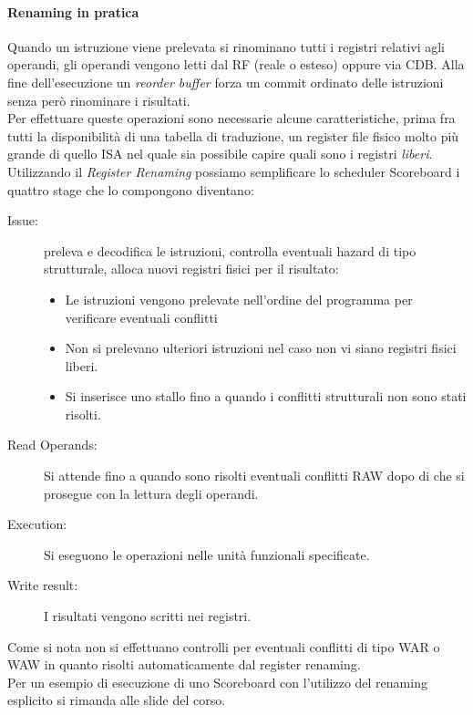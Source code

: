 \paragraph{Renaming in pratica}
Quando un istruzione viene prelevata si rinominano tutti i registri relativi agli operandi, gli operandi vengono letti dal RF (reale o esteso) oppure via CDB. Alla fine dell'esecuzione un \emph{reorder buffer} forza un commit ordinato delle istruzioni senza però rinominare i risultati.\\
Per effettuare queste operazioni sono necessarie alcune caratteristiche, prima fra tutti la disponibilità di una tabella di traduzione, un register file fisico molto più grande di quello ISA nel quale sia possibile capire quali sono i registri \emph{liberi}.\\
Utilizzando il \emph{Register Renaming} possiamo semplificare lo scheduler Scoreboard i quattro stage che lo compongono diventano:
\begin{description}
\item[Issue:] preleva e decodifica le istruzioni, controlla eventuali hazard di tipo strutturale, alloca nuovi registri fisici per il risultato:
\begin{itemize}
\item Le istruzioni vengono prelevate nell'ordine del programma per verificare eventuali conflitti 
\item Non si prelevano ulteriori istruzioni nel caso non vi siano registri fisici liberi.
\item Si inserisce uno stallo fino a quando i conflitti strutturali non sono stati risolti.
\end{itemize}
\item[Read Operands:] Si attende fino a quando sono risolti eventuali conflitti RAW dopo di che si prosegue con la lettura degli operandi.
\item[Execution:] Si eseguono le operazioni nelle unità funzionali specificate.
\item[Write result:] I risultati vengono scritti nei registri.
\end{description}
Come si nota non si effettuano controlli per eventuali conflitti di tipo WAR o WAW in quanto risolti automaticamente dal register renaming.\\
Per un esempio di esecuzione di uno Scoreboard con l'utilizzo del renaming esplicito si rimanda alle slide del corso.

